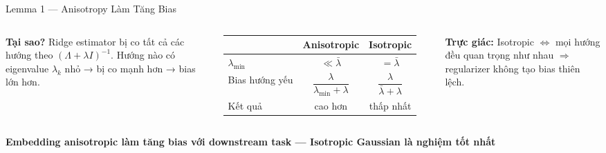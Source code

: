 \documentclass[aspectratio=169,9pt]{beamer}
\newcommand{\takeaway}[1]{%
  \vfill
  \begin{mdframed}[
    linecolor=maccent, linewidth=1.5pt,
    backgroundcolor=mlightgold,
    innertopmargin=5pt, innerbottommargin=5pt,
    innerleftmargin=10pt, innerrightmargin=10pt,
    roundcorner=3pt, skipabove=4pt, skipbelow=0pt
  ]
  \centering\small\bfseries\color{mprimary} #1
  \end{mdframed}%
}
\begin{document}
\begin{frame}{Lemma 1 — Anisotropy Làm Tăng Bias}
\begin{columns}[T]
\textbf{Tại sao?} Ridge estimator bị co tất cả các hướng theo $(\Lambda + \lambda I)^{-1}$. Hướng nào có eigenvalue $\lambda_k$ nhỏ → bị co mạnh hơn → bias lớn hơn.

\vspace{0.8em}
\begin{tabular}{@{}lcc@{}}
\toprule
 & Anisotropic & Isotropic \\
\midrule
$\lambda_{\min}$ & $\ll \bar\lambda$ & $= \bar\lambda$ \\
Bias hướng yếu & $\dfrac{\lambda}{\lambda_{\min}+\lambda}$ & $\dfrac{\lambda}{\bar\lambda+\lambda}$ \\[6pt]
Kết quả & \textcolor{mbad}{cao hơn} & \textcolor{mgood}{thấp nhất} \\
\bottomrule
\end{tabular}

\vspace{0.7em}
\begin{accentbox}
\footnotesize\textbf{Trực giác:} Isotropic $\Leftrightarrow$ mọi hướng đều quan trọng như nhau $\Rightarrow$ regularizer không tạo bias thiên lệch.
\end{accentbox}

\end{columns}

\takeaway{Embedding anisotropic làm tăng bias với downstream task — Isotropic Gaussian là nghiệm tốt nhất}

\end{frame}
\end{document}
